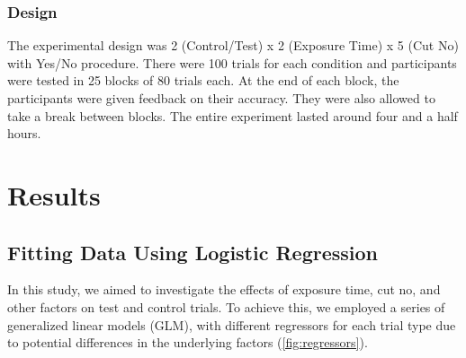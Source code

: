 \documentclass{article}
\begin{document}
\subsubsection{Design}
The experimental design was 2 (Control/Test) x 2 (Exposure Time) x 5 (Cut No) with Yes/No procedure. There were 100 trials for each condition and participants were tested in 25 blocks of 80 trials each. At the end of each block, the participants were given feedback on their accuracy. They were also allowed to take a break between blocks. The entire experiment lasted around four and a half hours.


\section{Results}
\subsection{Fitting Data Using Logistic Regression}
In this study, we aimed to investigate the effects of exposure time, cut no, and other factors on test and control trials. To achieve this, we employed a series of generalized linear models (GLM), with different regressors for each trial type due to potential differences in the underlying factors (\ref{fig:regressors}).
\end{document}
